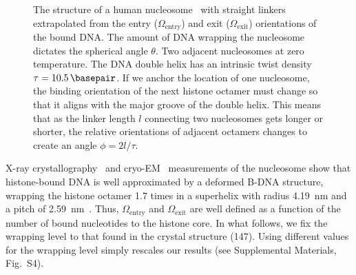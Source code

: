 \documentclass[%
 reprint,
superscriptaddress,
showpacs,preprintnumbers,
 amsmath,amssymb,
 aps,
 prl,
]{revtex4-1}
\begin{document}
\begin{figure}[t]
    \centering
    \hfill{}
    \caption{\protect{} The structure of a
        human nucleosome~\cite{wakamori2015} with straight linkers extrapolated
        from the entry ($\Omega_\text{entry}$) and exit ($\Omega_\text{exit}$)
        orientations of the bound DNA\@.
    The amount of DNA wrapping the nucleosome dictates the spherical angle
        $\theta$.
    \protect{} Two adjacent nucleosomes at zero
        temperature.
    The DNA double helix has an intrinsic twist density
        $\tau=\SI{10.5}{\basepair}$.
    If we anchor the location of one nucleosome, the
        binding orientation of the next histone octamer must change so that it
        aligns with the major groove of the double helix.
    This means that as the linker length $l$ connecting two nucleosomes gets
        longer or shorter, the relative orientations of adjacent octamers
        changes to create an angle $\phi = 2l/\tau$.
    }\label{fig:nuc-geo}
\end{figure}

X-ray crystallography~\cite{white2001,richmond2003,cutter2015a} and
    cryo-EM~\cite{bednar2017,bilokapic2018,eltsov2018,wakamori2015,zhou2015}
    measurements of the nucleosome show that histone-bound DNA is
    well approximated by a deformed B-DNA structure, wrapping the histone
    octamer 1.7 times in a superhelix with radius \SI{4.19}{\nano\metre} and a
    pitch of \SI{2.59}{\nano\metre}~\cite{richmond2003}.
Thus, $\Omega_\text{entry}$ and $\Omega_\text{exit}$ are well defined as a
    function of the number of bound nucleotides to the histone core.
In what follows, we fix the wrapping level to that found in the crystal
    structure (\SI{147}{\basepair}).
Using different values for the wrapping level simply rescales our
    results (see Supplemental Materials, Fig.~S4).
\end{document}
